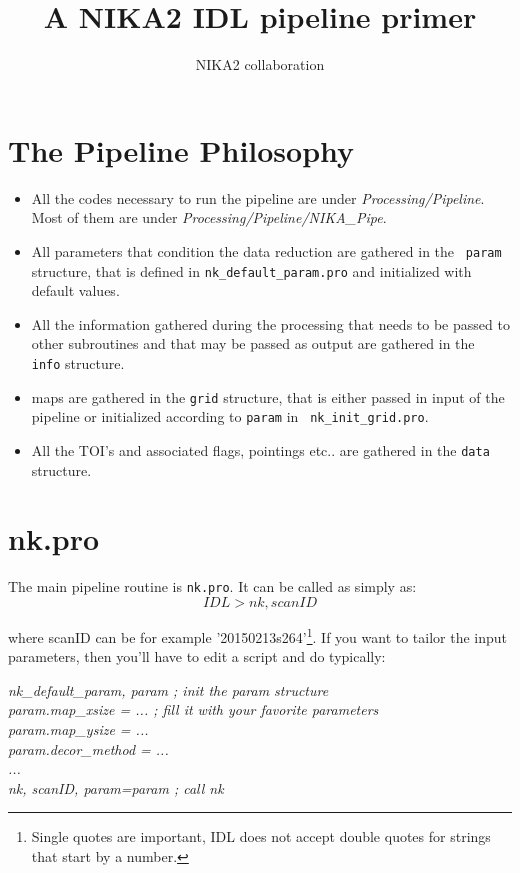 \documentclass[a4paper,10pt]{article}
\title{A NIKA2 IDL pipeline primer}
\author{NIKA2 collaboration}
\begin{document}
\maketitle
\tableofcontents



\section{The Pipeline Philosophy}
\begin{itemize}
\item All the codes necessary to run the pipeline are under {\it
  Processing/Pipeline}. Most of them are under {\it Processing/Pipeline/NIKA\_Pipe}.
\item All parameters that condition the data reduction are gathered in the {\tt
  param} structure, that is defined in {\tt nk\_default\_param.pro} and
  initialized with default values.
\item All the information gathered during the processing that needs to be passed
  to other subroutines and that may be passed as output are gathered in the {\tt
    info} structure.
\item maps are gathered in the {\tt grid} structure, that is either passed in
  input of the pipeline or initialized according to {\tt param} in {\tt
    nk\_init\_grid.pro}.
\item All the TOI's and associated flags, pointings etc.. are gathered in the
  {\tt data} structure.
\end{itemize}

\newpage
\section{nk.pro}

The main pipeline routine is {\tt nk.pro}. It can be called as simply as:
\begin{equation}
  IDL> nk, scanID
\end{equation}

\noindent where scanID can be for example '20150213s264'\footnote{Single quotes are important, IDL
does not accept double quotes for strings that start by a number.}. If you want
to tailor the input parameters, then you'll have to edit a script and do
typically:

\begin{center}
\begin{minipage}{10cm}
{\it
\noindent nk\_default\_param, param ; init the param structure\\
param.map\_xsize = ... ; fill it with your favorite parameters\\
param.map\_ysize = ...\\
param.decor\_method = ...\\
...\\
nk, scanID, param=param ; call nk\\
}
\end{minipage}
\end{center}
\end{document}
